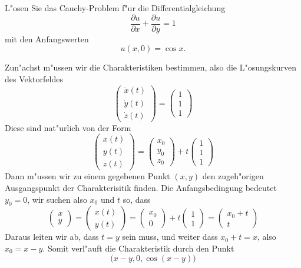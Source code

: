 L"osen Sie das Cauchy-Problem f"ur die Differentialgleichung
\[
\frac{\partial u}{\partial x}
+
\frac{\partial u}{\partial y}
=1
\]
mit den Anfangswerten
\[
u(x,0)=\cos x.
\]

\begin{loesung}
Zun"achst m"ussen wir die Charakteristiken bestimmen, also die L"osungskurven
des Vektorfeldes
\[
\begin{pmatrix}
\dot x(t)\\
\dot y(t)\\
\dot z(t)
\end{pmatrix}
=\begin{pmatrix}
1\\1\\1
\end{pmatrix}
\]
Diese sind nat"urlich von der Form
\[
\begin{pmatrix}
x(t)\\
y(t)\\
z(t)
\end{pmatrix}
=
\begin{pmatrix}x_0\\y_0\\z_0\end{pmatrix}
+
t\begin{pmatrix}1\\1\\1\end{pmatrix}
\]
Dann m"ussen wir zu einem gegebenen Punkt $(x,y)$ den zugeh"origen
Ausgangspunkt der Charakterisitik finden. Die Anfangsbedingung
bedeutet $y_0=0$, wir suchen also $x_0$ und $t$ so, dass
\[
\begin{pmatrix}
x\\y
\end{pmatrix}
=
\begin{pmatrix}
x(t)\\
y(t)
\end{pmatrix}
=
\begin{pmatrix}x_0\\0\end{pmatrix}
+
t\begin{pmatrix}1\\1\end{pmatrix}
=\begin{pmatrix}x_0+t\\t\end{pmatrix}
\]
Daraus leiten wir ab, dass $t=y$ sein muss, und weiter dass $x_0+t=x$, also
$x_0=x-y$. Somit verl"auft die Charakteristik durch den Punkt
\[
\biggl(x-y, 0,\cos (x-y)\biggr)
\]
\end{loesung}

